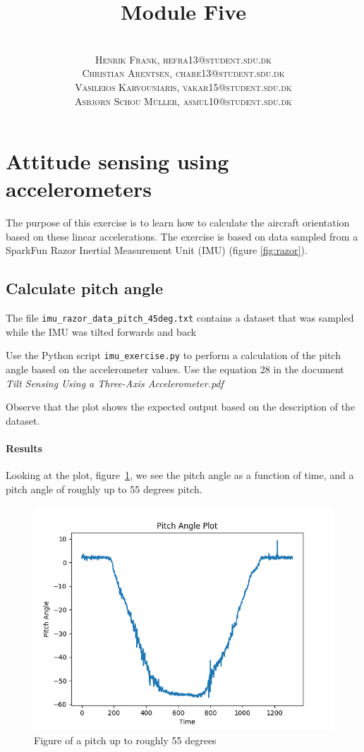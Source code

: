 \documentclass[paper=letter, fontsize=10pt]{article}
\title{\vspace{-15mm}\fontsize{24pt}{10pt}\selectfont\textbf{Module Five }} %
\author{
\large
{\textsc{}}\\[2mm]
{\textsc{Henrik Frank, hefra13@student.sdu.dk }}\\[2mm]
{\textsc{Christian Arentsen, chare13@student.sdu.dk }}\\[2mm]
{\textsc{Vasileios Karvouniaris, vakar15@student.sdu.dk }}\\[2mm]
{\textsc{Asbjørn Schou Müller, asmul10@student.sdu.dk }}
}
\date{}
\begin{document}
\maketitle %
\thispagestyle{fancy} %

\section{Attitude sensing using accelerometers}

The purpose of this exercise is to learn how to calculate the aircraft orientation based on these linear accelerations. The exercise is based on data sampled from a SparkFun Razor Inertial Measurement Unit (IMU) (figure \ref{fig:razor}). 

\subsection{Calculate pitch angle}
The file \texttt{imu\_razor\_data\_pitch\_45deg.txt} contains a dataset that was sampled while the IMU was tilted forwards and back

Use the Python script \texttt{imu\_exercise.py} to perform a calculation of the pitch angle based on the accelerometer values. Use the equation 28 in the document \textit{Tilt Sensing Using a Three-Axis Accelerometer.pdf}

Observe that the plot shows the expected output based on the description of the dataset.

\paragraph{Results}
Looking at the plot, figure~\ref{fig:ex1_plot}, we see the pitch angle as a function of time, and a pitch angle of roughly up to 55 degrees pitch.

\begin{figure}[h!]
\centering
\includegraphics[scale=.65]{Figures/ex1_pitch_angle}
\caption{Figure of a pitch up to roughly 55 degrees}
\label{fig:ex1_plot}
\end{figure}
\end{document}

